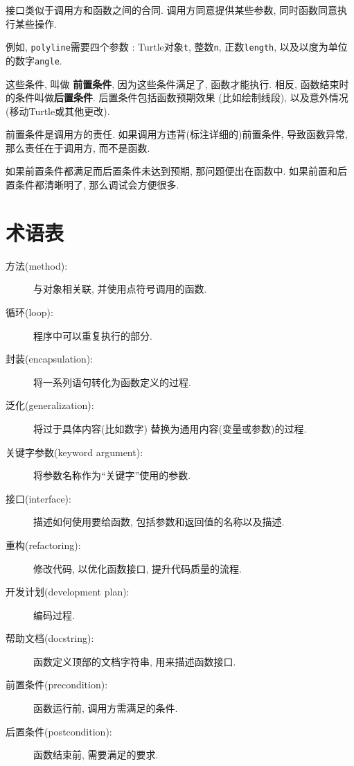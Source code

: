 \documentclass[10pt]{book}
\begin{document}
接口类似于调用方和函数之间的合同. 
调用方同意提供某些参数, 同时函数同意执行某些操作. 

例如, {\tt polyline}需要四个参数 : Turtle对象{\tt t},  整数{\tt n}, 
正数{\tt length}, 以及以度为单位的数字{\tt angle}.

这些条件, 叫做 {\bf 前置条件}, 因为这些条件满足了, 函数才能执行. 
相反, 函数结束时的条件叫做{\bf 后置条件}. 后置条件包括函数预期效果
(比如绘制线段), 以及意外情况(移动Turtle或其他更改).

前置条件是调用方的责任. 如果调用方违背(标注详细的)前置条件, 导致函数异常, 
那么责任在于调用方, 而不是函数. 

如果前置条件都满足而后置条件未达到预期, 那问题便出在函数中. 
如果前置和后置条件都清晰明了, 那么调试会方便很多. 

\section{术语表}

\begin{description}

\item[方法(method):] 与对象相关联, 并使用点符号调用的函数. 

\item[循环(loop):] 程序中可以重复执行的部分. 

\item[封装(encapsulation):] 将一系列语句转化为函数定义的过程. 

\item[泛化(generalization):] 将过于具体内容(比如数字)
替换为通用内容(变量或参数)的过程. 

\item[关键字参数(keyword argument):] 将参数名称作为``关键字''使用的参数. 

\item[接口(interface):] 描述如何使用要给函数, 包括参数和返回值的名称以及描述. 

\item[重构(refactoring):] 修改代码, 以优化函数接口, 提升代码质量的流程.

\item[开发计划(development plan):] 编码过程.

\item[帮助文档(docstring):] 函数定义顶部的文档字符串, 用来描述函数接口. 

\item[前置条件(precondition):] 函数运行前, 调用方需满足的条件. 

\item[后置条件(postcondition):] 函数结束前, 需要满足的要求.

\end{description}
\end{document}
